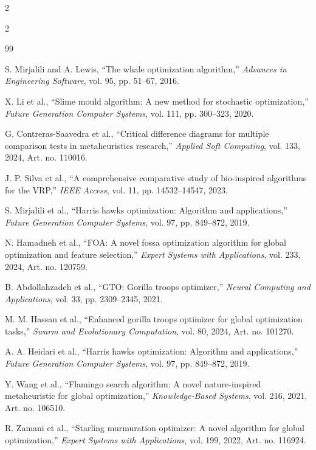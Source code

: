\documentclass[10pt,a4paper]{extarticle}
\begin{document}
\begin{table}[!htbp]
\begin{multicols}{2}
\begin{multicols}{2}
\begin{thebibliography}{99}

 S. Mirjalili and A. Lewis, ``The whale optimization algorithm,'' \textit{Advances in Engineering Software}, vol. 95, pp. 51--67, 2016.

 X. Li et al., ``Slime mould algorithm: A new method for stochastic optimization,'' \textit{Future Generation Computer Systems}, vol. 111, pp. 300--323, 2020.

 G. Contreras-Saavedra et al., ``Critical difference diagrams for multiple comparison tests in metaheuristics research,'' \textit{Applied Soft Computing}, vol. 133, 2024, Art. no. 110016.

 J. P. Silva et al., ``A comprehensive comparative study of bio-inspired algorithms for the VRP,'' \textit{IEEE Access}, vol. 11, pp. 14532--14547, 2023.

 S. Mirjalili et al., ``Harris hawks optimization: Algorithm and applications,'' \textit{Future Generation Computer Systems}, vol. 97, pp. 849--872, 2019.

 N. Hamadneh et al., ``FOA: A novel fossa optimization algorithm for global optimization and feature selection,'' \textit{Expert Systems with Applications}, vol. 233, 2024, Art. no. 120759.

 B. Abdollahzadeh et al., ``GTO: Gorilla troops optimizer,'' \textit{Neural Computing and Applications}, vol. 33, pp. 2309--2345, 2021.

 M. M. Hassan et al., ``Enhanced gorilla troops optimizer for global optimization tasks,'' \textit{Swarm and Evolutionary Computation}, vol. 80, 2024, Art. no. 101270.

 A. A. Heidari et al., ``Harris hawks optimization: Algorithm and applications,'' \textit{Future Generation Computer Systems}, vol. 97, pp. 849--872, 2019.

 Y. Wang et al., ``Flamingo search algorithm: A novel nature-inspired metaheuristic for global optimization,'' \textit{Knowledge-Based Systems}, vol. 216, 2021, Art. no. 106510.

 R. Zamani et al., ``Starling murmuration optimizer: A novel algorithm for global optimization,'' \textit{Expert Systems with Applications}, vol. 199, 2022, Art. no. 116924.


\end{thebibliography}
\end{multicols}
\end{multicols}
\end{table}
\end{document}
